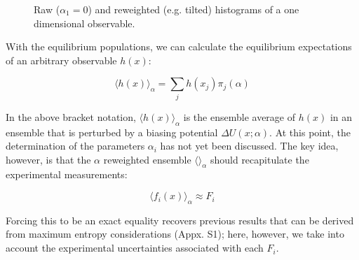 \documentclass[11pt,titlepage]{article}
\begin{document}
\begin{figure}

\caption{
Raw ($\alpha_1 = 0$) and reweighted (e.g. tilted) histograms of a one dimensional observable.
}
\label{figure:Hist}
\end{figure}

With the equilibrium populations, we can calculate the equilibrium expectations of an arbitrary observable $h(x)$:

$$\langle h(x)\rangle _\alpha = \sum_j h(x_j) \pi_j(\alpha)$$

In the above bracket notation, $\langle h(x)\rangle _\alpha$ is the ensemble average of $h(x)$ in an ensemble that is perturbed by a biasing potential $\Delta U(x;\alpha)$.  At this point, the determination of the parameters $\alpha_i$ has not yet been discussed.  The key idea, however, is that the $\alpha$ reweighted ensemble $\langle \rangle _\alpha$ should recapitulate the experimental measurements:

$$\langle f_i(x)\rangle _\alpha \approx F_i$$

Forcing this to be an exact equality recovers previous results \citep{chodera2012} that can be derived from maximum entropy considerations (Appx. S1); here, however, we take into account the experimental uncertainties associated with each $F_i$.  
\end{document}
